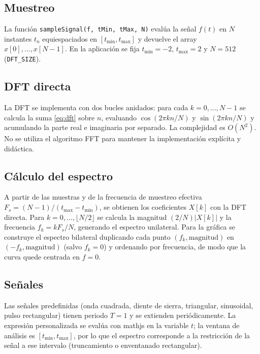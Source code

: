 \documentclass[12pt,a4paper]{article}
\begin{document}
\subsection{Muestreo}

La función \texttt{sampleSignal(f, tMin, tMax, N)} evalúa la señal \(f(t)\) en \(N\) instantes \(t_n\) equiespaciados en \([t_{\min}, t_{\max}]\) y devuelve el array \(x[0], \ldots, x[N-1]\). En la aplicación se fija \(t_{\min} = -2\), \(t_{\max} = 2\) y \(N = 512\) (\texttt{DFT\_SIZE}).

\subsection{DFT directa}

La DFT se implementa con dos bucles anidados: para cada \(k = 0, \ldots, N-1\) se calcula la suma \eqref{eq:dft} sobre \(n\), evaluando \(\cos(2\pi kn/N)\) y \(\sin(2\pi kn/N)\) y acumulando la parte real e imaginaria por separado. La complejidad es \(O(N^2)\). No se utiliza el algoritmo FFT para mantener la implementación explícita y didáctica.

\subsection{Cálculo del espectro}

A partir de las muestras y de la frecuencia de muestreo efectiva \(F_s = (N-1)/(t_{\max}-t_{\min})\), se obtienen los coeficientes \(X[k]\) con la DFT directa. Para \(k = 0, \ldots, \lfloor N/2 \rfloor\) se calcula la magnitud \((2/N)|X[k]|\) y la frecuencia \(f_k = k F_s/N\), generando el espectro unilateral. Para la gráfica se construye el espectro bilateral duplicando cada punto \((f_k, \text{magnitud})\) en \((-f_k, \text{magnitud})\) (salvo \(f_k=0\)) y ordenando por frecuencia, de modo que la curva quede centrada en \(f=0\).

\subsection{Señales}

Las señales predefinidas (onda cuadrada, diente de sierra, triangular, sinusoidal, pulso rectangular) tienen periodo \(T=1\) y se extienden periódicamente. La expresión personalizada se evalúa con mathjs en la variable \(t\); la ventana de análisis es \([t_{\min}, t_{\max}]\), por lo que el espectro corresponde a la restricción de la señal a ese intervalo (truncamiento o enventanado rectangular).
\end{document}
